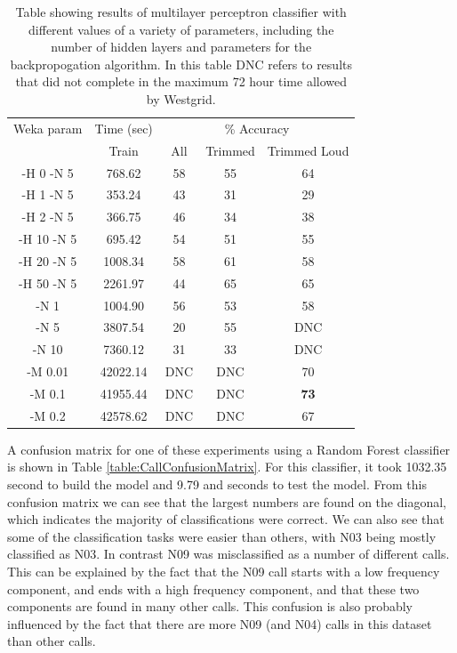 \begin{table}
\begin{tabular}{|c|c|c|c|c|}
\hline
\multicolumn{1}{|c|}{Weka param} & \multicolumn{1}{c|}{Time (sec)} & \multicolumn{3}{c|}{\% Accuracy} \\
\hhline{|-|-|-|-|-|}
 & Train & All & Trimmed & Trimmed Loud \\
\hhline{|=|=|=|=|=|}
 -H 0 -N 5      &   768.62  &    58  & 55  & 64  \\
 -H 1 -N 5      &   353.24  &    43  & 31  & 29  \\
 -H 2 -N 5      &   366.75  &    46  & 34  & 38  \\
 -H 10 -N 5     &   695.42  &    54  & 51  & 55  \\
 -H 20 -N 5     &  1008.34  &    58  & 61  & 58  \\
 -H 50 -N 5     &  2261.97  &    44  & 65  & 65  \\
 -N 1           &  1004.90  &    56  & 53  & 58  \\
 -N 5           &  3807.54  &    20  & 55  & DNC \\
 -N 10          &  7360.12  &    31  & 33  & DNC \\
 -M 0.01        &  42022.14 &    DNC & DNC & 70  \\
 -M 0.1         &  41955.44 &    DNC & DNC & \textbf{73}  \\
 -M 0.2         &  42578.62 &    DNC & DNC & 67  \\
\hline
\end{tabular}
\caption{Table showing results of multilayer perceptron classifier
  with different values of a variety of parameters, including the
  number of hidden layers and parameters for the backpropogation
  algorithm.  In this table DNC refers to results that did not
  complete in the maximum 72 hour time allowed by Westgrid.}
\label{table:calls-weka-multilayerPerceptron}
\end{table}

A confusion matrix for one of these experiments using a Random Forest
classifier is shown in Table \ref{table:CallConfusionMatrix}.  For
this classifier, it took 1032.35 second to build the model and 9.79
and seconds to test the model.  From this confusion matrix we can see
that the largest numbers are found on the diagonal, which indicates
the majority of classifications were correct.  We can also see that
some of the classification tasks were easier than others, with N03
being mostly classified as N03. In contrast N09 was misclassified as a
number of different calls.  This can be explained by the fact that the
N09 call starts with a low frequency component, and ends with a high
frequency component, and that these two components are found in many
other calls.  This confusion is also probably influenced by the fact
that there are more N09 (and N04) calls in this dataset than other
calls.

